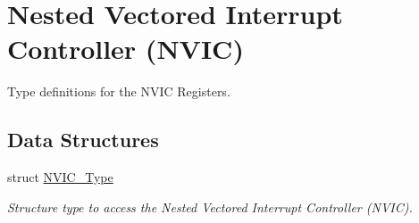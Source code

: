 \hypertarget{group___c_m_s_i_s___n_v_i_c}{}\section{Nested Vectored Interrupt Controller (N\+V\+IC)}
\label{group___c_m_s_i_s___n_v_i_c}


Type definitions for the N\+V\+IC Registers.  


\subsection*{Data Structures}
\begin{DoxyCompactItemize}
\item 
struct \hyperlink{struct_n_v_i_c___type}{N\+V\+I\+C\+\_\+\+Type}
\begin{DoxyCompactList}\small\item\em Structure type to access the Nested Vectored Interrupt Controller (N\+V\+IC). \end{DoxyCompactList}\end{DoxyCompactItemize}
